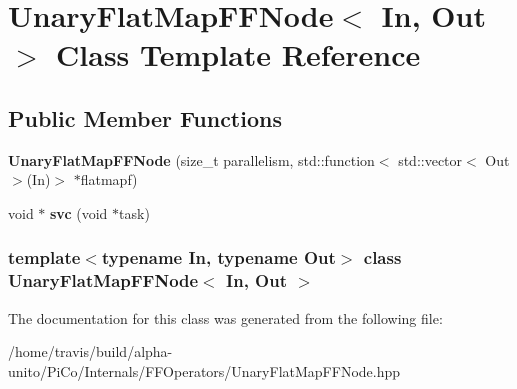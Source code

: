 \hypertarget{class_unary_flat_map_f_f_node}{\section{\-Unary\-Flat\-Map\-F\-F\-Node$<$ \-In, \-Out $>$ \-Class \-Template \-Reference}
\label{class_unary_flat_map_f_f_node}
}
\subsection*{\-Public \-Member \-Functions}
\begin{DoxyCompactItemize}
\item 
\hypertarget{class_unary_flat_map_f_f_node_a499b4632b4942c1e69c889e2d268333b}{{\bfseries \-Unary\-Flat\-Map\-F\-F\-Node} (size\-\_\-t parallelism, std\-::function$<$ std\-::vector$<$ \-Out $>$(\-In)$>$ $\ast$flatmapf)}\label{class_unary_flat_map_f_f_node_a499b4632b4942c1e69c889e2d268333b}

\item 
\hypertarget{class_unary_flat_map_f_f_node_abe8d9f971dd708546ce60daf0fcd3b3f}{void $\ast$ {\bfseries svc} (void $\ast$task)}\label{class_unary_flat_map_f_f_node_abe8d9f971dd708546ce60daf0fcd3b3f}

\end{DoxyCompactItemize}
\subsubsection*{template$<$typename \-In, typename \-Out$>$ class Unary\-Flat\-Map\-F\-F\-Node$<$ In, Out $>$}



\-The documentation for this class was generated from the following file\-:\begin{DoxyCompactItemize}
\item 
/home/travis/build/alpha-\/unito/\-Pi\-Co/\-Internals/\-F\-F\-Operators/\-Unary\-Flat\-Map\-F\-F\-Node.\-hpp\end{DoxyCompactItemize}
